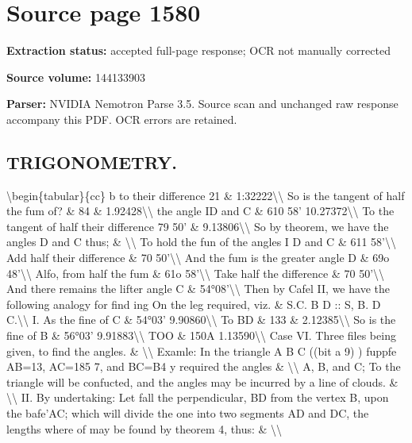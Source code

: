\clearpage
\section{Source page 1580}
\textbf{Extraction status:} accepted full-page response; OCR not manually corrected\par
\textbf{Source volume:} 144133903\par
\textbf{Parser:} NVIDIA Nemotron Parse 3.5. Source scan and unchanged raw response accompany this PDF. OCR errors are retained.\par\medskip
\subsection*{TRIGONOMETRY.}
\textbackslash{}begin\{tabular\}\{cc\}
b to their difference 21 \& 1:32222\textbackslash{}\textbackslash{}
So is the tangent of half the fum of? \& 84 \& 1.92428\textbackslash{}\textbackslash{}
the angle ID and C \& 610 58' 10.27372\textbackslash{}\textbackslash{}
To the tangent of half their difference 79 50' \& 9.13806\textbackslash{}\textbackslash{}
So by theorem, we have the angles D and C thus; \& \textbackslash{}\textbackslash{}
To hold the fun of the angles I D and C \& 611 58'\textbackslash{}\textbackslash{}
Add half their difference \& 70 50'\textbackslash{}\textbackslash{}
And the fum is the greater angle D \& 69o 48'\textbackslash{}\textbackslash{}
Alfo, from half the fum \& 61o 58'\textbackslash{}\textbackslash{}
Take half the difference \& 70 50'\textbackslash{}\textbackslash{}
And there remains the lifter angle C \& 54°08'\textbackslash{}\textbackslash{}
Then by Cafel II, we have the following analogy for find ing On the leg required, viz. \& S.C. B D :: S, B. D C.\textbackslash{}\textbackslash{}
I. As the fine of C \& 54°03' 9.90860\textbackslash{}\textbackslash{}
To BD \& 133 \& 2.12385\textbackslash{}\textbackslash{}
So is the fine of B \& 56°03' 9.91883\textbackslash{}\textbackslash{}
TOO \& 150A 1.13590\textbackslash{}\textbackslash{}
Case VI. Three files being given, to find the angles. \& \textbackslash{}\textbackslash{}
Examle: In the triangle A B C ((bit a 9) ) fuppfe AB=13, AC=185 7, and BC=B4 y required the angles \& \textbackslash{}\textbackslash{}
A, B, and C; To the triangle will be confucted, and the angles may be incurred by a line of clouds. \& \textbackslash{}\textbackslash{}
II. By undertaking: Let fall the perpendicular, BD from the vertex B, upon the bafe’AC; which will divide the one into two segments AD and DC, the lengths where of may be found by theorem 4, thus: \& \textbackslash{}\textbackslash{}
